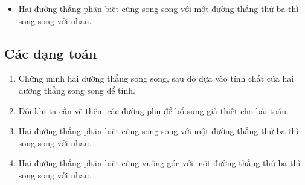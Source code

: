 \begin{enumerate}[\tickEX]
\begin{itemize}
{}	
\item  Hai đường thẳng phân biệt cùng song song với một đường thẳng thứ ba thì song song với nhau.
\end{itemize}
\end{enumerate}



\subsection{Các dạng toán}
\begin{dang}
\begin{enumerate}[\tickEX]
\item Chứng minh hai đường thẳng song song, sau đó dựa vào tính chất của hai đường thẳng song song để tính.
\item Đôi khi ta cần vẽ thêm các đường phụ để bổ sung giả thiết cho bài toán.
\item Hai đường thẳng phân biệt cùng song song với một đường thẳng thứ ba thì song song với nhau.
\item Hai đường thẳng phân biệt cùng vuông góc với một đường thẳng thứ ba thì song song với nhau.
\end{enumerate}
\end{dang}

